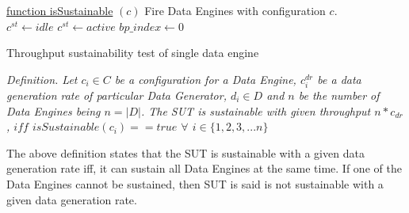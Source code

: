 \documentclass{vldb}
\begin{document}
\begin{algorithm}

    \underline{function isSustainable} $(c)$\;
    Fire Data Engines with configuration $c$. \\
    $c^{st} \gets idle$  
       $c^{st} \gets active$ 
       $bp\_index \gets 0$ 
    \caption{Throughput sustainability test of single data engine}
    \label{alg_sustainable}
\end{algorithm}

\textit{Definition.  Let $c_{i} \in C$ be a configuration for a Data Engine, $c_{i}^{dr}$ be a data generation rate of particular Data Generator, $d_{i} \in D$ and $n$ be the number of Data Engines being $n = |D|$.  The SUT is sustainable with given throughput $n * c_{dr}$,  $iff$ $isSustainable(c_{i})  == true$ $\forall$ $i \in \{1,2,3,...n\}$}

The above definition states that the SUT is sustainable with a given data generation rate iff, it can sustain all Data Engines at the same time. If one of the Data Engines cannot be sustained, then SUT is said is not sustainable with a given data generation rate. 
\end{document}
